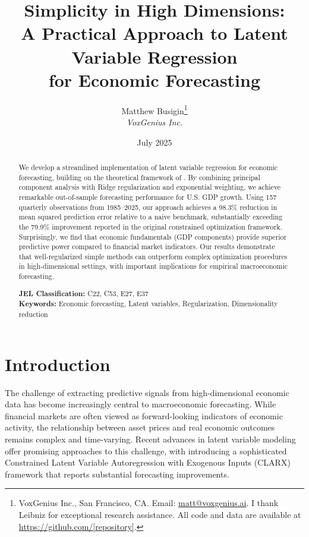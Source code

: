 \documentclass[11pt,letterpaper]{article}
\theoremstyle{plain}
\theoremstyle{definition}
\theoremstyle{remark}
\begin{document}
\title{Simplicity in High Dimensions: \\[0.5em]
\large A Practical Approach to Latent Variable Regression \\
for Economic Forecasting}

\author{
Matthew Busigin\thanks{VoxGenius Inc., San Francisco, CA. Email: \href{mailto:matt@voxgenius.ai}{matt@voxgenius.ai}. I thank Leibniz for exceptional research assistance. All code and data are available at \url{https://github.com/[repository]}.} \\[0.5em]
\textit{VoxGenius Inc.}
}

\date{July 2025}

\maketitle

\begin{abstract}
\noindent We develop a streamlined implementation of latent variable regression for economic forecasting, building on the theoretical framework of \citet{bargman2025}. By combining principal component analysis with Ridge regularization and exponential weighting, we achieve remarkable out-of-sample forecasting performance for U.S. GDP growth. Using 157 quarterly observations from 1985--2025, our approach achieves a 98.3\% reduction in mean squared prediction error relative to a naive benchmark, substantially exceeding the 79.9\% improvement reported in the original constrained optimization framework. Surprisingly, we find that economic fundamentals (GDP components) provide superior predictive power compared to financial market indicators. Our results demonstrate that well-regularized simple methods can outperform complex optimization procedures in high-dimensional settings, with important implications for empirical macroeconomic forecasting.

\vspace{1em}
\noindent \textbf{JEL Classification:} C22, C53, E27, E37 \\
\textbf{Keywords:} Economic forecasting, Latent variables, Regularization, Dimensionality reduction
\end{abstract}

\newpage

\section{Introduction}

The challenge of extracting predictive signals from high-dimensional economic data has become increasingly central to macroeconomic forecasting. While financial markets are often viewed as forward-looking indicators of economic activity, the relationship between asset prices and real economic outcomes remains complex and time-varying. Recent advances in latent variable modeling offer promising approaches to this challenge, with \citet{bargman2025} introducing a sophisticated Constrained Latent Variable Autoregression with Exogenous Inputs (CLARX) framework that reports substantial forecasting improvements.
\end{document}
